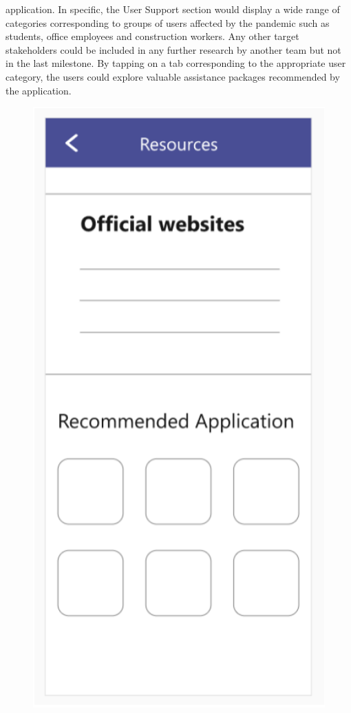 \begin{enumerate}[a)]
          application. In specific, the User Support section would display a wide range of categories
          corresponding to groups of users affected by the pandemic such as students, office employees and
          construction workers. Any other target stakeholders could be included in any further research by
          another team but not in the last milestone. By tapping on a tab corresponding to the appropriate
          user category, the users could explore valuable assistance packages recommended by the application.
          \begin{figure}[H]
            \centering
            \includegraphics[scale=1]{img/prototype/iter3-proto-7.png}

\end{figure}
\end{enumerate}
